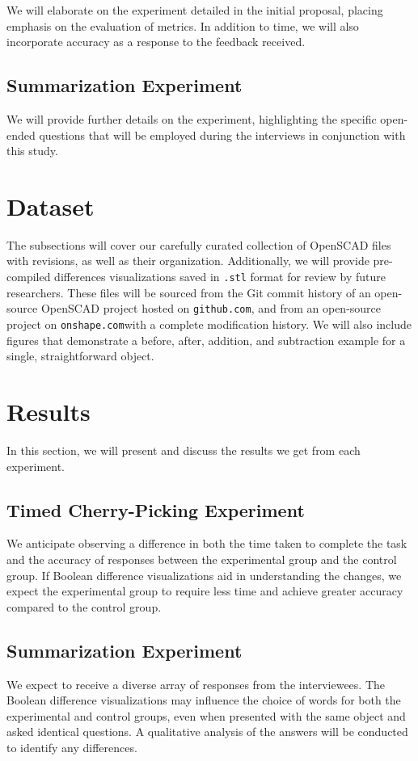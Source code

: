 \documentclass[sigconf,authorversion,nonacm]{acmart}
\begin{document}
We will elaborate on the experiment detailed in the initial proposal, placing emphasis on the evaluation of metrics. In addition to time, we will also incorporate accuracy as a response to the feedback received.

\subsection{Summarization Experiment}

We will provide further details on the experiment, highlighting the specific open-ended questions that will be employed during the interviews in conjunction with this study.

\section{Dataset}

The subsections will cover our carefully curated collection of OpenSCAD files with revisions, as well as their organization. Additionally, we will provide pre-compiled differences visualizations saved in \texttt{.stl} format for review by future researchers. These files will be sourced from the Git commit history of an open-source OpenSCAD project hosted on \texttt{github.com}, and from an open-source project on \texttt{onshape.com}with a complete modification history.
We will also include figures that demonstrate a before, after, addition, and subtraction example for a single, straightforward object.

\section{Results}

In this section, we will present and discuss the results we get from each experiment.
\subsection{Timed Cherry-Picking Experiment}
We anticipate observing a difference in both the time taken to complete the task and the accuracy of responses between the experimental group and the control group. If Boolean difference visualizations aid in understanding the changes, we expect the experimental group to require less time and achieve greater accuracy compared to the control group.

\subsection{Summarization Experiment}
We expect to receive a diverse array of responses from the interviewees. The Boolean difference visualizations may influence the choice of words for both the experimental and control groups, even when presented with the same object and asked identical questions. A qualitative analysis of the answers will be conducted to identify any differences.
\end{document}
